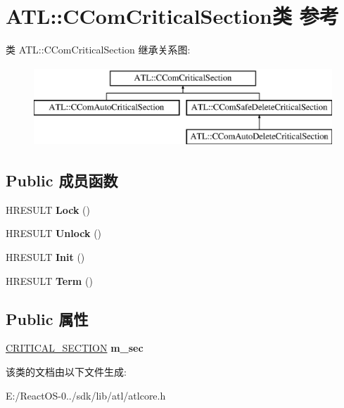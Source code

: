 \hypertarget{class_a_t_l_1_1_c_com_critical_section}{}\section{A\+TL\+:\+:C\+Com\+Critical\+Section类 参考}
\label{class_a_t_l_1_1_c_com_critical_section}
类 A\+TL\+:\+:C\+Com\+Critical\+Section 继承关系图\+:\begin{figure}[H]
\begin{center}
\leavevmode
\includegraphics[height=3.000000cm]{class_a_t_l_1_1_c_com_critical_section}
\end{center}
\end{figure}
\subsection*{Public 成员函数}
\begin{DoxyCompactItemize}
\item 
\mbox{\label{class_a_t_l_1_1_c_com_critical_section_a70ee326157169572af0a09051da8437b}} 
H\+R\+E\+S\+U\+LT {\bfseries Lock} ()
\item 
\mbox{\label{class_a_t_l_1_1_c_com_critical_section_af6b3d06e3f78ddfef41892bb83ad0c32}} 
H\+R\+E\+S\+U\+LT {\bfseries Unlock} ()
\item 
\mbox{\label{class_a_t_l_1_1_c_com_critical_section_a44d9f87b823e8d46a02660b7bd171459}} 
H\+R\+E\+S\+U\+LT {\bfseries Init} ()
\item 
\mbox{\label{class_a_t_l_1_1_c_com_critical_section_af0be0d07ab5e52a33e745d72f9c16548}} 
H\+R\+E\+S\+U\+LT {\bfseries Term} ()
\end{DoxyCompactItemize}
\subsection*{Public 属性}
\begin{DoxyCompactItemize}
\item 
\mbox{\label{class_a_t_l_1_1_c_com_critical_section_aeb3a34bd636f666bb3e16b00c7dd310f}} 
\hyperlink{struct___c_r_i_t_i_c_a_l___s_e_c_t_i_o_n}{C\+R\+I\+T\+I\+C\+A\+L\+\_\+\+S\+E\+C\+T\+I\+ON} {\bfseries m\+\_\+sec}
\end{DoxyCompactItemize}


该类的文档由以下文件生成\+:\begin{DoxyCompactItemize}
\item 
E\+:/\+React\+O\+S-\/0../sdk/lib/atl/atlcore.\+h\end{DoxyCompactItemize}
